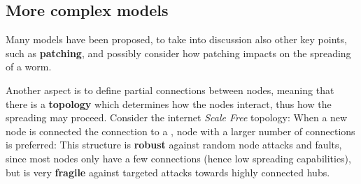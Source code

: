 \subsection{More complex models}
Many models have been proposed, to take into discussion also other key points,
such as \textbf{patching},
and possibly consider how patching impacts on the spreading of a worm.

Another aspect is to define partial connections between nodes,
meaning that there is a \textbf{topology} which determines how the nodes interact,
thus how the spreading may proceed.
Consider the internet \textit{Scale Free} topology:
When a new node is connected the connection to a , node with
a larger number of connections is preferred:
This structure is \textbf{robust} against random node attacks and faults,
since most nodes only have a few connections (hence low spreading capabilities),
but is very \textbf{fragile} against targeted attacks towards highly connected hubs.
